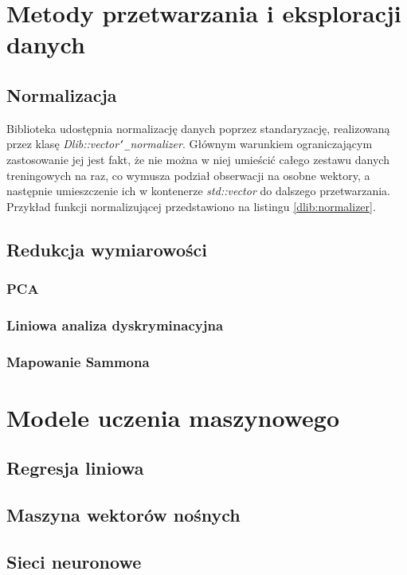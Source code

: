 \section{Metody przetwarzania i eksploracji danych}

\subsection{Normalizacja}
Biblioteka udostępnia normalizację danych poprzez standaryzację, realizowaną przez klasę \textit{Dlib::vector\texttt{\char`_}normalizer}. Głównym warunkiem ograniczającym zastosowanie jej jest fakt, że nie można w niej umieścić całego zestawu danych treningowych na raz, co wymusza podział obserwacji na osobne wektory, a następnie umieszczenie ich w kontenerze \textit{std::vector} do dalszego przetwarzania. Przykład funkcji normalizującej przedstawiono na listingu \ref{dlib:normalizer}.


\subsection{Redukcja wymiarowości}

\subsubsection{PCA}
\subsubsection{Liniowa analiza dyskryminacyjna}
\subsubsection{Mapowanie Sammona}

\section{Modele uczenia maszynowego}

\subsection{Regresja liniowa}
\subsection{Maszyna wektorów nośnych}
\subsection{Sieci neuronowe}
